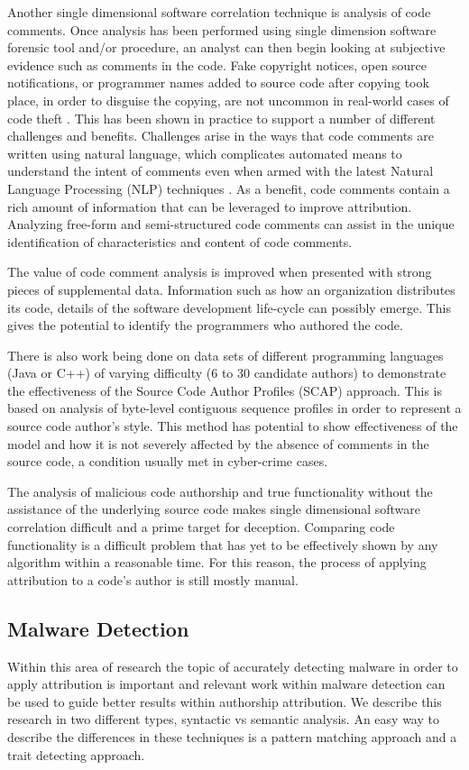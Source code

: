 \documentclass[12pt]{report}
\begin{document}
Another single dimensional software correlation technique is analysis of code comments.  Once analysis has been performed using single dimension software forensic tool and/or procedure, an analyst can then begin looking at subjective evidence such as comments in the code.  Fake copyright notices, open source notifications, or programmer names added to source code after copying took place, in order to disguise the copying, are not uncommon in real-world cases of code theft \cite{sfbook:2011}.  This has been shown in practice to support a number of different challenges and benefits.  Challenges arise in the ways that code comments are written using natural language, which complicates automated means to understand the intent of comments even when armed with the latest Natural Language Processing (NLP) techniques \cite{artsci:2015}.  As a benefit, code comments contain a rich amount of information that can be leveraged to improve attribution.  Analyzing free-form and semi-structured code comments can assist in the unique identification of characteristics and content of code comments.

The value of code comment analysis is improved when presented with strong pieces of supplemental data.  Information such as how an organization distributes its code, details of the software development life-cycle can possibly emerge.  This gives the potential to identify the programmers who authored the code.  

There is also work being done on data sets of different programming languages (Java or C++) of varying difficulty (6 to 30 candidate authors) to demonstrate the effectiveness of the Source Code Author Profiles (SCAP) approach.  This is based on analysis of byte-level contiguous sequence profiles in order to represent a source code author’s style.  \cite{IFIP:2006} This method has potential to show effectiveness of the model and how it is not severely affected by the absence of comments in the source code, a condition usually met in cyber-crime cases.

The analysis of malicious code authorship and true functionality without the assistance of the underlying source code makes single dimensional software correlation difficult and a prime target for deception.  Comparing code functionality is a difficult problem that has yet to be effectively shown by any algorithm within a reasonable time.  For this reason, the process of applying attribution to a code's author is still mostly manual.

\subsection{Malware Detection}
Within this area of research the topic of accurately detecting malware in order to apply attribution is important and relevant work within malware detection can be used to guide better results within authorship attribution.  We describe this research in two different types, syntactic vs semantic analysis.  An easy way to describe the differences in these techniques is a pattern matching approach and a trait detecting approach.
\end{document}

